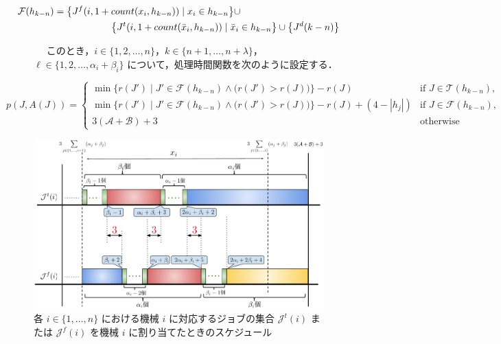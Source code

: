 \documentclass[12pt]{optlab-bachelor}
\begin{document}
\begin{equation}
  \begin{split}
    \mathcal{F}(h_{k - n}) &= \big\{J^f(i,1 + count(
    x_i,h_{k - n})) \mid x_i \in h_{k - n} \big\} \cup \\ &\qquad\qquad\qquad \big\{J^t(i,1 + count(\bar x_i,h_{k - n})) \mid \bar x_i \in h_{k - n}\big\}  \cup \big\{J^d(k - n)\big\} \notag
  \end{split}
\end{equation}
\begin{description}
  \item[] ~~ このとき，$i \in \{1,2,\ldots,n\}$，$k \in \{n + 1, \ldots , n + \lambda\}$，$\ell \in \{1,2,\ldots, \alpha_i + \beta_i\}$ について，処理時間関数を次のように設定する．
\end{description}
{\small
\begin{equation}
  p(J,A(J)) = \left\{ \begin{array}{lll} \min \bigg\{r(J') \mid
  J' \in \mathcal{F}(h_{k - n}) \wedge \big(r(J') > r(J) \big) \bigg\} - r(J)
  & \text{if } J \in \mathcal{T}(h_{k - n}), \\ \min \bigg\{r(J') \mid
  J' \in \mathcal{F}(h_{k - n}) \wedge \big(r(J') > r(J) \big) \bigg\} - r(J)
  + (4 - |h_j|) & \text{if } J \in \mathcal{F}(h_{k - n}), \\ 3(\mathcal{A} + \mathcal{B}) + 3 & \text{otherwise}\end{array} \right. \tag{B.1}
\end{equation}
}

\begin{figure}[h]
  \centering
  \includegraphics[width = 16cm]{figure/3SAT1.pdf}
  \caption{各 $i \in \{1,\ldots,n\}$ における機械 $i$ に対応するジョブの集合 $\mathcal{J}^t(i)$ または $\mathcal{J}^f(i)$ を機械 $i$ に割り当てたときのスケジュール}
\end{figure}
\end{document}

